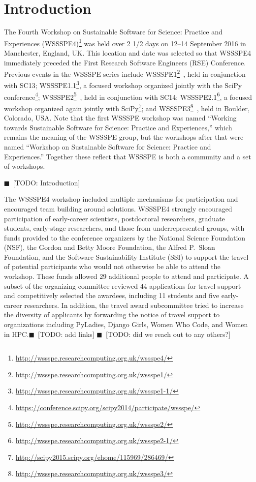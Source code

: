 \documentclass[11pt, oneside]{amsart}
\newcommand{\todo}[1]{{\color{blue}$\blacksquare$~\textsf{[TODO: #1]}}}
\begin{document}
\section{Introduction} \label{sec:intro}

The Fourth Workshop on Sustainable Software for Science: Practice and Experiences
(WSSSPE4)\footnote{\url{http://wssspe.researchcomputing.org.uk/wssspe4/}} was
held over 2 1/2 days on 12--14 September 2016 in Manchester, England, UK.
This location and date was selected so that WSSSPE4 immediately preceded the
First Research Software Engineers (RSE) Conference.
Previous events in the WSSSPE series include
WSSSPE1\footnote{\url{http://wssspe.researchcomputing.org.uk/wssspe1/}}~\cite{WSSSPE1-pre-report,WSSSPE1},
held in conjunction with SC13;
WSSSPE1.1\footnote{\url{http://wssspe.researchcomputing.org.uk/wssspe1-1/}}, a
focused workshop organized jointly with the SciPy
conference\footnote{\url{https://conference.scipy.org/scipy2014/participate/wssspe/}};
WSSSPE2\footnote{\url{http://wssspe.researchcomputing.org.uk/wssspe2/}}~\cite{WSSSPE2-pre-report,WSSSPE2},
held in conjunction with SC14;
WSSSPE2.1\footnote{\url{http://wssspe.researchcomputing.org.uk/wssspe2-1/}}, a
focused workshop organized again jointly with
SciPy\footnote{\url{http://scipy2015.scipy.org/ehome/115969/286469/}};
and WSSSPE3\footnote{\url{http://wssspe.researchcomputing.org.uk/wssspe3/}}~\cite{WSSSPE3},
held in Boulder, Colorado, USA.
Note that the first WSSSPE workshop was named
``Working towards
Sustainable Software for Science: Practice and Experiences,'' which remains the meaning
of the WSSSPE group, but the workshops after that were named
``Workshop on Sustainable
Software for Science: Practice and Experiences.'' Together these reflect
that WSSSPE is both a community and a set of workshops.

\todo{Introduction}

The WSSSPE4 workshop included multiple mechanisms for participation and
encouraged team building around solutions. WSSSPE4 strongly encouraged participation
of early-career scientists, postdoctoral researchers, graduate students,
early-stage researchers, and those from underrepresented groups,
with funds provided to the conference organizers by the National Science
Foundation (NSF), the Gordon and Betty Moore Foundation, the Alfred P.~Sloan Foundation, and the Software
Sustainability Institute (SSI) to support the travel of potential participants
who would not otherwise be able to attend the workshop. These
funds allowed 29 additional people to attend and participate. A subset of the
organizing committee reviewed 44 applications for travel support and
competitively selected the awardees, including 11 students and five early-career
researchers. In addition, the travel award subcommittee tried to increase the
diversity of applicants by forwarding the notice of travel support to
organizations including PyLadies, Django Girls, Women Who Code, and
Women in HPC.\todo{add links}
\todo{did we reach out to any others?}
\end{document}

